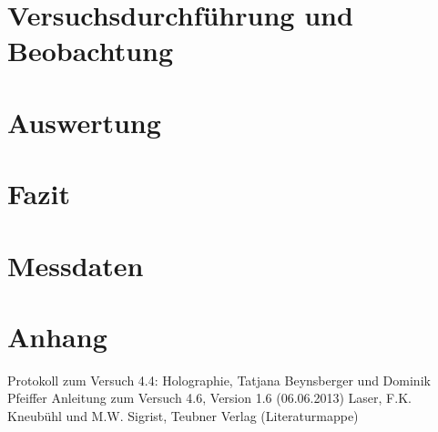 \documentclass[twoside,colorback,accentcolor=tud4c,11pt]{tudreport}
\begin{document}
\chapter{Versuchsdurchführung und Beobachtung}
  
     	
\chapter{Auswertung}
\chapter{Fazit}
\chapter{Messdaten}


\chapter{Anhang}





		

\renewcommand{\bibname}{Literatur}
\begin{thebibliography}{0}
 Protokoll zum Versuch 4.4: Holographie, Tatjana Beynsberger und Dominik Pfeiffer 
 Anleitung zum Versuch 4.6, Version 1.6 (06.06.2013)
 Laser, F.K. Kneubühl und M.W. Sigrist, Teubner Verlag (Literaturmappe)
\end{thebibliography} 	
\end{document}

